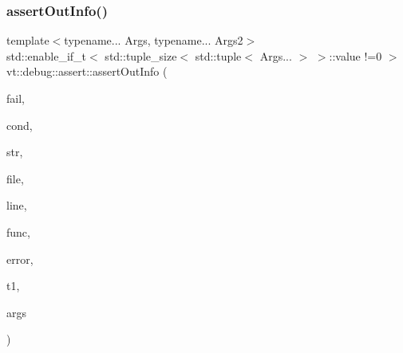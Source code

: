 \subsubsection{\texorpdfstring{assert\+Out\+Info()}{assertOutInfo()}\hspace{0.1cm}{\footnotesize\ttfamily [3/3]}}
{\footnotesize\ttfamily template$<$typename... Args, typename... Args2$>$ \\
std\+::enable\+\_\+if\+\_\+t$<$ std\+::tuple\+\_\+size$<$ std\+::tuple$<$ Args... $>$ $>$\+::value !=0 $>$ vt\+::debug\+::assert\+::assert\+Out\+Info (\begin{DoxyParamCaption}\item[{bool}]{fail,  }\item[{std\+::string const}]{cond,  }\item[{std\+::string const \&}]{str,  }\item[{std\+::string const \&}]{file,  }\item[{int const}]{line,  }\item[{std\+::string const \&}]{func,  }\item[{\hyperlink{namespacevt_a793764d753923abc3d32929870beb485}{Error\+Code\+Type}}]{error,  }\item[{std\+::tuple$<$ Args2... $>$ \&\&}]{t1,  }\item[{std\+::tuple$<$ Args... $>$ \&\&}]{args }\end{DoxyParamCaption})\hspace{0.3cm}{\ttfamily [inline]}}

